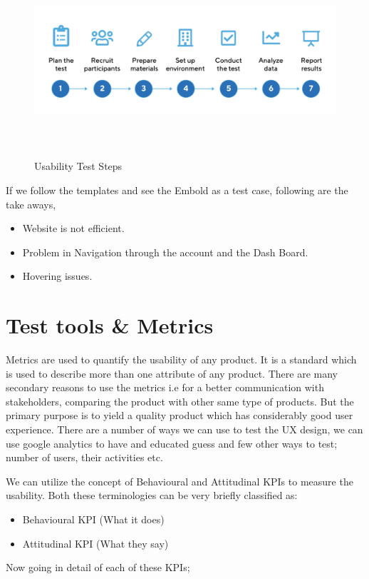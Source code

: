 \begin{figure}[htbp]
\begin{center}
\includegraphics[width=6.5in, height=2.8in]{usability-testing.png}
\caption{Usability Test Steps}
\label{fig:usability}
\end{center}
\end{figure}
If we follow the templates and see the Embold as a test case, following are the take aways,

\begin{itemize}
\item Website is not efficient.
\item Problem in Navigation through the account and the Dash Board.
\item Hovering issues.
\end{itemize}

\section{Test tools \& Metrics}
Metrics are used to quantify the usability of any product. It is a standard which  is used to describe more than one attribute of any product. There are many secondary reasons to use the metrics i.e for a better communication with stakeholders, comparing the product with other same type of products. But the primary purpose is to yield a quality product which has considerably good user experience.
There are a number of ways we can use to test the UX design, we can use google analytics to have and educated guess and few other ways to test; number of users, their activities etc.  \par
We can utilize the concept of Behavioural and Attitudinal KPIs to measure the usability. Both these terminologies can be very briefly classified as: ~\cite{tools}
\begin{itemize}
\item Behavioural KPI (What it does)
\item Attitudinal KPI (What they say)
\end{itemize} 
Now going in detail of each of these KPIs;
